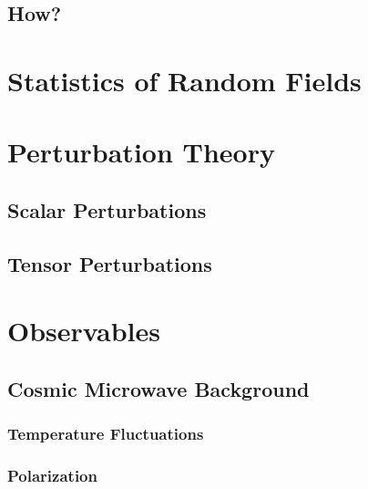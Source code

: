 \documentclass[12pt]{article}
\begin{document}
\subsection{How?}

\section{Statistics of Random Fields}


\section{Perturbation Theory}

\subsection{Scalar Perturbations}

\subsection{Tensor Perturbations}

\section{Observables}

\subsection{Cosmic Microwave Background}

\subsubsection{Temperature Fluctuations}
\subsubsection{Polarization}
\end{document}
